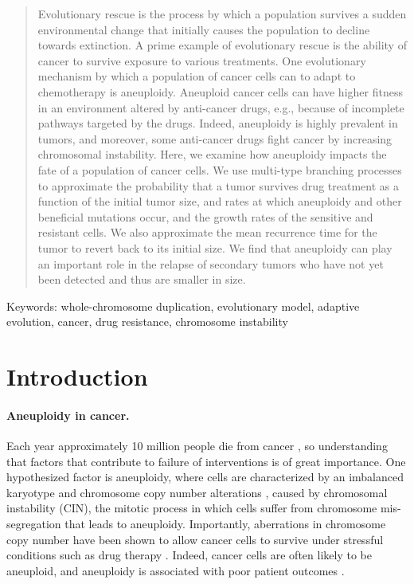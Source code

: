 \documentclass[12pt]{extarticle}
\begin{document}
% 

\begin{abstract}
Evolutionary rescue is the process by which a population survives a sudden environmental change that initially causes the population to decline towards extinction.
A prime example of evolutionary rescue is the ability of cancer to survive exposure to various treatments. 
One evolutionary mechanism by which a population of cancer cells can to adapt to chemotherapy is aneuploidy.  
Aneuploid cancer cells can have higher fitness in an environment altered by anti-cancer drugs, e.g., because of incomplete pathways targeted by the drugs. 
Indeed, aneuploidy is highly prevalent in tumors, and moreover, some anti-cancer drugs fight cancer by increasing chromosomal instability.
Here, we examine how aneuploidy impacts the fate of a population of cancer cells. We use multi-type branching processes to approximate the probability that a tumor survives drug treatment as a function of the initial tumor size, and rates at which aneuploidy and other beneficial mutations occur, and the growth rates of the sensitive and resistant cells. We also approximate the mean recurrence time for the tumor to revert back to its initial size.
We find that aneuploidy can play an important role in the relapse of secondary tumors who have not yet been detected and thus are smaller in size.
\end{abstract}

Keywords: whole-chromosome duplication, evolutionary model, adaptive evolution, cancer, drug resistance, chromosome instability

\newpage
\section*{Introduction}


\paragraph{Aneuploidy in cancer.}  Each year approximately 10 million people die from cancer \citep{kocarnik2022cancer}, so understanding that factors that contribute to failure of interventions is of great importance. One hypothesized factor is aneuploidy, where cells are characterized by an imbalanced karyotype and chromosome copy number alterations \citep{schukken2018cin}, caused by chromosomal instability (CIN), the mitotic process in which cells suffer from chromosome mis-segregation that leads to aneuploidy. Importantly, aberrations in chromosome copy number have been shown to allow cancer cells to survive under stressful conditions such as drug therapy \citep{lukow2021chromosomal,rutledge2016selective}. Indeed, cancer cells are often likely to be aneuploid, and aneuploidy is associated with poor patient outcomes \citep{ben2020context,smith2018systematic}. 
\end{document}
